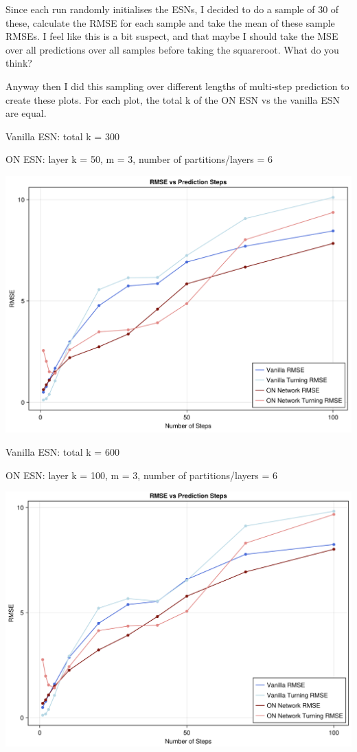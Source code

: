 \documentclass[a4paper,12pt]{article}
\begin{document}
Since each run randomly initialises the ESNs, I decided to do a sample of 30 of these, calculate the RMSE for each sample and take the mean of these sample RMSEs. I feel like this is a bit suspect, and that maybe I should take the MSE over all predictions over all samples before taking the squareroot. What do you think?

Anyway then I did this sampling over different lengths of multi-step prediction to create these plots. For each plot, the total k of the ON ESN vs the vanilla ESN are equal.

\newpage

Vanilla ESN: total k = 300

ON ESN: layer k = 50, m = 3, number of partitions/layers = 6

\includegraphics[width=\textwidth]{figure_4.png}


\newpage

Vanilla ESN: total k = 600

ON ESN: layer k = 100, m = 3, number of partitions/layers = 6

\includegraphics[width=\textwidth]{figure_5.png}
\end{document}
